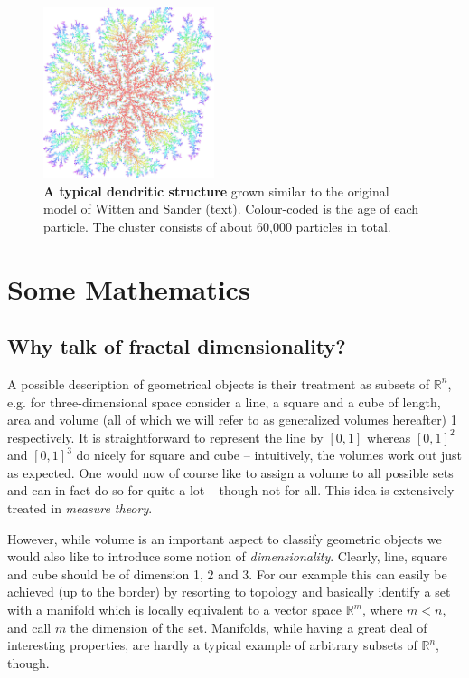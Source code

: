 \documentclass[twocolumn,10pt]{scrartcl}
\begin{document}
        \begin{figure}
            \center
            \includegraphics[width=5cm]{img/wsdendrite.jpg}
            \caption[A typical dendritic structure]
                {\small\textbf{A typical dendritic structure} grown similar to the original model of Witten
                and Sander (text). Colour-coded is the age of each particle. The cluster consists of about
                60,000 particles in total.}
            \label{fig-wsdendrite}
        \end{figure}

    \section{Some Mathematics}
        \subsection{Why talk of fractal dimensionality?}
            A possible description of geometrical objects is their treatment as subsets of $\mathbb{R}^n$, e.g. for
            three-dimensional space consider a line, a square and a cube of length, area and volume (all of which we
            will refer to as generalized volumes hereafter) 1 respectively. It is straightforward to represent the line
            by $\left[0,1\right]$ whereas $\left[0,1\right]^2$ and $\left[0,1\right]^3$ do nicely for square and cube
            -- intuitively, the volumes work out just as expected. One would now of course like to assign a 
            volume to all possible sets and can in fact do so for quite a lot -- though not for all. This idea is
            extensively treated in \emph{measure theory}.
            
            However, while volume is an important aspect to classify geometric objects we would also like to
            introduce some notion of \emph{dimensionality}. Clearly, line, square and cube should be of dimension 1, 2
            and 3. For our example this can easily be achieved (up to the border) by resorting to topology and
            basically identify a set with a manifold which is locally equivalent to a vector space
            $\mathbb{R}^m$, where $m<n$, and call $m$ the dimension of the set. Manifolds, while having a great deal
            of interesting properties, are hardly a typical example of arbitrary subsets of $\mathbb{R}^n$, though.
            
\end{document}
